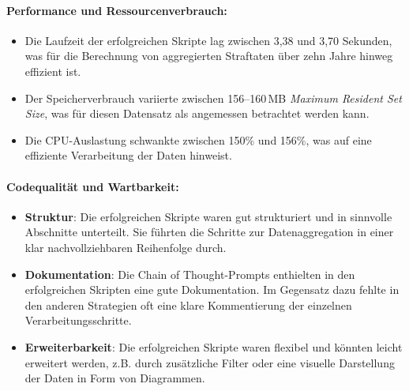 \documentclass[11pt,a4paper]{article}
\begin{document}
\begin{table}[h]
    \centering
    \caption{Ergebnisse von Testfall 6}
    \label{tab:auswertung_testfall6}
\end{table}

\paragraph{Performance und Ressourcenverbrauch:}
\begin{itemize}
    \item Die Laufzeit der erfolgreichen Skripte lag zwischen 3,38 und 3,70 Sekunden, was für die Berechnung von aggregierten Straftaten über zehn Jahre hinweg effizient ist.
    \item Der Speicherverbrauch variierte zwischen 156--160\,MB \emph{Maximum Resident Set Size}, was für diesen Datensatz als angemessen betrachtet werden kann.
    \item Die CPU-Auslastung schwankte zwischen 150\% und 156\%, was auf eine effiziente Verarbeitung der Daten hinweist.
\end{itemize}

\paragraph{Codequalität und Wartbarkeit:}
\begin{itemize}
    \item \textbf{Struktur}: Die erfolgreichen Skripte waren gut strukturiert und in sinnvolle Abschnitte unterteilt. Sie führten die Schritte zur Datenaggregation in einer klar nachvollziehbaren Reihenfolge durch.
    \item \textbf{Dokumentation}: Die Chain of Thought-Prompts enthielten in den erfolgreichen Skripten eine gute Dokumentation. Im Gegensatz dazu fehlte in den anderen Strategien oft eine klare Kommentierung der einzelnen Verarbeitungsschritte.
    \item \textbf{Erweiterbarkeit}: Die erfolgreichen Skripte waren flexibel und könnten leicht erweitert werden, z.B. durch zusätzliche Filter oder eine visuelle Darstellung der Daten in Form von Diagrammen.
\end{itemize}
\end{document}
